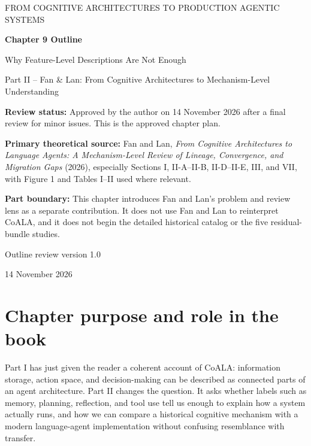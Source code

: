 


\thispagestyle{empty}
\begin{center}
{\sffamily\Large\color{BookBlue} FROM COGNITIVE ARCHITECTURES TO PRODUCTION AGENTIC SYSTEMS\par}
\vspace{1.2cm}
{\sffamily\huge\bfseries\color{BookBlue} Chapter 9 Outline\par}
\vspace{0.45cm}
{\sffamily\LARGE Why Feature-Level Descriptions Are Not Enough\par}
\vspace{0.8cm}
{\large Part II -- Fan \& Lan: From Cognitive Architectures to Mechanism-Level Understanding\par}
\vfill
\begin{learningbox}
\textbf{Review status:} Approved by the author on 14 November 2026 after a final review for minor issues. This is the approved chapter plan.

\textbf{Primary theoretical source:} Fan and Lan, \emph{From Cognitive Architectures to Language Agents: A Mechanism-Level Review of Lineage, Convergence, and Migration Gaps} (2026), especially Sections I, II-A--II-B, II-D--II-E, III, and VII, with Figure 1 and Tables I--II used where relevant.

\textbf{Part boundary:} This chapter introduces Fan and Lan's problem and review lens as a separate contribution. It does not use Fan and Lan to reinterpret CoALA, and it does not begin the detailed historical catalog or the five residual-bundle studies.
\end{learningbox}
\vfill
{\sffamily\large Outline review version 1.0\par}
{\small 14 November 2026\par}
\end{center}
\clearpage

\setcounter{chapter}{9}
\section{Chapter purpose and role in the book}
Part I has just given the reader a coherent account of CoALA: information storage, action space, and decision-making can be described as connected parts of an agent architecture. Part II changes the question. It asks whether labels such as memory, planning, reflection, and tool use tell us enough to explain how a system actually runs, and how we can compare a historical cognitive mechanism with a modern language-agent implementation without confusing resemblance with transfer.

